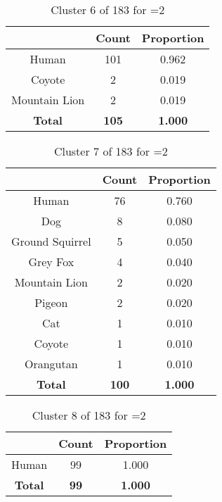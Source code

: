 \begin{table}[ht!]
\centering
\begin{tabular}{|c|c|c|}
\hline
\bf \Spec{} &\bf Count &\bf Proportion\\ \hline \hline
Human & 101 & 0.962\\ \hline
Coyote & 2 & 0.019\\ \hline
Mountain Lion & 2 & 0.019\\ \hline
\hline
\bf Total & \bf 105 & \bf 1.000\\ \hline
\end{tabular}
\label{tab:cluster:6:2}
\caption{Cluster 6 of 183 for \minneigh{}=2}
\end{table}

\begin{table}[ht!]
\centering
\begin{tabular}{|c|c|c|}
\hline
\bf \Spec{} &\bf Count &\bf Proportion\\ \hline \hline
Human & 76 & 0.760\\ \hline
Dog & 8 & 0.080\\ \hline
Ground Squirrel & 5 & 0.050\\ \hline
Grey Fox & 4 & 0.040\\ \hline
Mountain Lion & 2 & 0.020\\ \hline
Pigeon & 2 & 0.020\\ \hline
Cat & 1 & 0.010\\ \hline
Coyote & 1 & 0.010\\ \hline
Orangutan & 1 & 0.010\\ \hline
\hline
\bf Total & \bf 100 & \bf 1.000\\ \hline
\end{tabular}
\label{tab:cluster:7:2}
\caption{Cluster 7 of 183 for \minneigh{}=2}
\end{table}

\begin{table}[ht!]
\centering
\begin{tabular}{|c|c|c|}
\hline
\bf \Spec{} &\bf Count &\bf Proportion\\ \hline \hline
Human & 99 & 1.000\\ \hline
\hline
\bf Total & \bf 99 & \bf 1.000\\ \hline
\end{tabular}
\label{tab:cluster:8:2}
\caption{Cluster 8 of 183 for \minneigh{}=2}
\end{table}

